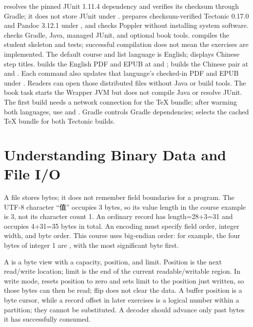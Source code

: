  resolves the pinned JUnit 1.11.4 dependency and verifies its checksum through Gradle; it does not store JUnit under .  prepares checksum-verified Tectonic 0.17.0 and Pandoc 3.12.1 under , and checks Poppler without installing system software.  checks Gradle, Java, managed JUnit, and optional book tools.  compiles the student skeleton and tests; successful compilation does not mean the exercises are implemented. The default course and list language is English;  displays Chinese step titles.  builds the English PDF and EPUB at  and ;  builds the Chinese pair at  and . Each command also updates that language's checked-in PDF and EPUB under . Readers can open those distributed files without Java or build tools. The book task starts the Wrapper JVM but does not compile Java or resolve JUnit. The first build needs a network connection for the TeX bundle; after warming both languages, use  and . Gradle  controls Gradle dependencies;  selects the cached TeX bundle for both Tectonic builds.

\section{Understanding Binary Data and File I/O}
A file stores bytes; it does not remember field boundaries for a program. The UTF-8 character “值” occupies 3 bytes, so its value length in the course example is 3, not its character count 1. An ordinary record has length=28+3=31 and occupies 4+31=35 bytes in total. An encoding must specify field order, integer width, and byte order. This course uses big-endian order: for example, the four bytes of integer 1 are , with the most significant byte first.

A  is a byte view with a capacity, position, and limit. Position is the next read/write location; limit is the end of the current readable/writable region. In write mode,  resets position to zero and sets limit to the position just written, so those bytes can then be read; flip does not clear the data. A buffer position is a byte cursor, while a record offset in later exercises is a logical number within a partition; they cannot be substituted. A decoder should advance only past bytes it has successfully consumed.

